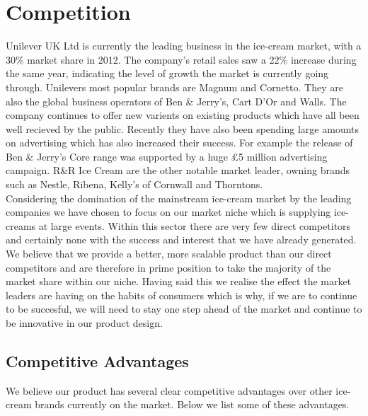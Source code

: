 \documentclass{article}
\begin{document}
\section{Competition}

  Unilever UK Ltd is currently the leading business in the ice-cream market, with a 30\% market share in 2012. The company's retail sales saw a 22\% increase during the same year, indicating the level of growth the market is currently going through. Unilevers most popular brands are Magnum and Cornetto. They are also the global business operators of Ben \& Jerry's, Cart D'Or and Walls. The company continues to offer new varients on existing products which have all been well recieved by the public. Recently they have also been spending large amounts on advertising which has also increased their success. For example the release of Ben \& Jerry's Core range was supported by a huge £5 million advertising campaign. R\&R Ice Cream are the other notable market leader, owning brands such as Nestle, Ribena, Kelly's of Cornwall and Thorntons. \\

  Considering the domination of the mainstream ice-cream market by the leading companies we have chosen to focus on our market niche which is supplying ice-creams at large events. Within this sector there are very few direct competitors and certainly none with the success and interest that we have already generated. We believe that we provide a better, more scalable product than our direct competitors and are therefore in prime position to take the majority of the market share within our niche. Having said this we realise the effect the market leaders are having on the habits of consumers which is why, if we are to continue to be succesful, we will need to stay one step ahead of the market and continue to be innovative in our product design.

\subsection{Competitive Advantages}

  We believe our product has several clear competitive advantages over other ice-cream brands currently on the market. Below we list some of these advantages.
\end{document}
